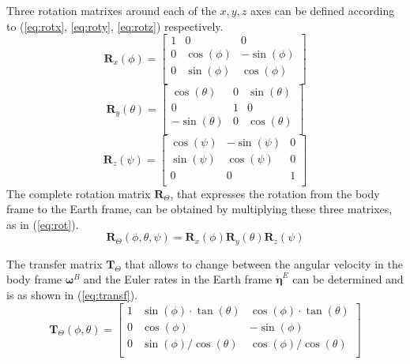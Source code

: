 \documentclass[journal]{IEEEtran}
\begin{document}
	Three rotation matrixes around each of the $x, y, z$ axes can be defined according to (\ref{eq:rotx}, \ref{eq:roty}, \ref{eq:rotz}) respectively.
	\begin{equation} \label{eq:rotx}
	\bm{R}_x (\phi)=
	\left[ {\begin{array}{ccc}
		1 & 0 & 0 \\
		0 & \cos(\phi) & -\sin(\phi) \\
		0 &  \sin(\phi) & \cos(\phi) \\ 
		\end{array} } \right]
	\end{equation}  
	\begin{equation} \label{eq:roty}
	\bm{R}_y (\theta)=
	\left[ {\begin{array}{ccc}
		\cos(\theta) & 0 & \sin(\theta) \\
		0 & 1 & 0 \\
		-\sin(\theta) &  0 & \cos(\theta) \\ 
		\end{array} } \right]
	\end{equation}  
	\begin{equation} \label{eq:rotz}
	\bm{R}_z (\psi)=
	\left[ {\begin{array}{ccc}
		\cos(\psi) & -\sin(\psi) & 0 \\
		\sin(\psi) & \cos(\psi) & 0 \\
		0 &  0 & 1 \\ 
		\end{array} } \right]
	\end{equation}  
	The complete rotation matrix $\bm{R}_\Theta$, that expresses the rotation from the body frame to the Earth frame, can be obtained by multiplying these three matrixes, as in (\ref{eq:rot}).
	\begin{equation} \label{eq:rot}
	\bm{R}_\Theta (\phi, \theta, \psi) = 	\bm{R}_x (\phi)  \bm{R}_y (\theta)  \bm{R}_z (\psi)
	\end{equation}  
	
	The transfer matrix $\bm{T}_\Theta$ that allows to change between the angular velocity in the body frame $\bm{\omega}^B$ and the Euler rates in the Earth frame $\bm{\dot \eta}^E$  can be determined and is as shown in (\ref{eq:transf}).
	\begin{equation} \label{eq:transf}
	\bm{T}_\Theta (\phi,\theta )= \left[ {\begin{array}{ccc}
		1 & \sin(\phi) \cdot \tan(\theta) & \cos(\phi) \cdot \tan (\theta) \\
		0 & \cos(\phi) & -\sin(\phi) \\
		0 &  \sin(\phi)/\cos(\theta) & \cos(\phi)/\cos(\theta)  \\ 
		\end{array} } \right]
	\end{equation}  
	
\end{document}
